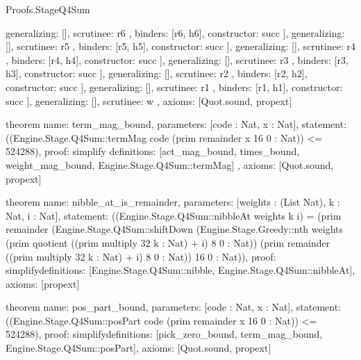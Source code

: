 \begin{lexlean}{Proofs.StageQ4Sum}
\begin{semanticmodule}
{{{{{{{{{{{{{{                                        generalizing: [],
                                        scrutinee: r6
                                      },
                                      binders: [r6, h6],
                                      constructor: succ
                                    }
                                  ],
                                  generalizing: [],
                                  scrutinee: r5
                                },
                                binders: [r5, h5],
                                constructor: succ
                              }
                            ],
                            generalizing: [],
                            scrutinee: r4
                          },
                          binders: [r4, h4],
                          constructor: succ
                        }
                      ],
                      generalizing: [],
                      scrutinee: r3
                    },
                    binders: [r3, h3],
                    constructor: succ
                  }
                ],
                generalizing: [],
                scrutinee: r2
              },
              binders: [r2, h2],
              constructor: succ
            }
          ],
          generalizing: [],
          scrutinee: r1
        },
        binders: [r1, h1],
        constructor: succ
      }
    ],
    generalizing: [],
    scrutinee: w
  },
  axioms: [Quot.sound, propext]
}

theorem{
  name: term_mag_bound,
  parameters: [code : Nat, x : Nat],
  statement: ((Engine.Stage.Q4Sum::termMag code (prim remainder x 16 0 : Nat)) <= 524288),
  proof: simplify{
    definitions: [act_mag_bound, times_bound, weight_mag_bound, Engine.Stage.Q4Sum::termMag]
  },
  axioms: [Quot.sound, propext]
}

theorem{
  name: nibble_at_is_remainder,
  parameters: [weights : (List Nat), k : Nat, i : Nat],
  statement: ((Engine.Stage.Q4Sum::nibbleAt weights k i) = (prim remainder (Engine.Stage.Q4Sum::shiftDown (Engine.Stage.Greedy::nth weights (prim quotient ((prim multiply 32 k : Nat) + i) 8 0 : Nat)) (prim remainder ((prim multiply 32 k : Nat) + i) 8 0 : Nat)) 16 0 : Nat)),
  proof: simplify{definitions: [Engine.Stage.Q4Sum::nibble, Engine.Stage.Q4Sum::nibbleAt]},
  axioms: [propext]
}

theorem{
  name: pos_part_bound,
  parameters: [code : Nat, x : Nat],
  statement: ((Engine.Stage.Q4Sum::posPart code (prim remainder x 16 0 : Nat)) <= 524288),
  proof: simplify{definitions: [pick_zero_bound, term_mag_bound, Engine.Stage.Q4Sum::posPart]},
  axioms: [Quot.sound, propext]
}


\end{semanticmodule}
\end{lexlean}
